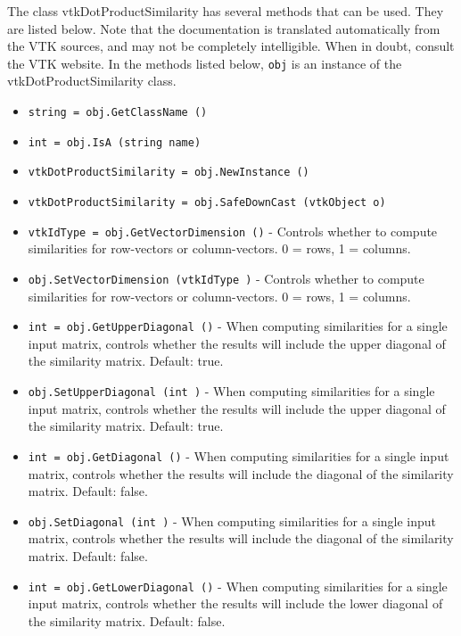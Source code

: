 The class vtkDotProductSimilarity has several methods that can be used.
  They are listed below.
Note that the documentation is translated automatically from the VTK sources,
and may not be completely intelligible.  When in doubt, consult the VTK website.
In the methods listed below, \verb|obj| is an instance of the vtkDotProductSimilarity class.
\begin{itemize}
\item  \verb|string = obj.GetClassName ()|

\item  \verb|int = obj.IsA (string name)|

\item  \verb|vtkDotProductSimilarity = obj.NewInstance ()|

\item  \verb|vtkDotProductSimilarity = obj.SafeDownCast (vtkObject o)|

\item  \verb|vtkIdType = obj.GetVectorDimension ()| -  Controls whether to compute similarities for row-vectors or column-vectors.
 0 = rows, 1 = columns.

\item  \verb|obj.SetVectorDimension (vtkIdType )| -  Controls whether to compute similarities for row-vectors or column-vectors.
 0 = rows, 1 = columns.

\item  \verb|int = obj.GetUpperDiagonal ()| -  When computing similarities for a single input matrix, controls whether the
 results will include the upper diagonal of the similarity matrix.  Default: true.

\item  \verb|obj.SetUpperDiagonal (int )| -  When computing similarities for a single input matrix, controls whether the
 results will include the upper diagonal of the similarity matrix.  Default: true.

\item  \verb|int = obj.GetDiagonal ()| -  When computing similarities for a single input matrix, controls whether the
 results will include the diagonal of the similarity matrix.  Default: false.

\item  \verb|obj.SetDiagonal (int )| -  When computing similarities for a single input matrix, controls whether the
 results will include the diagonal of the similarity matrix.  Default: false.

\item  \verb|int = obj.GetLowerDiagonal ()| -  When computing similarities for a single input matrix, controls whether the
 results will include the lower diagonal of the similarity matrix.  Default: false.


\end{itemize}
